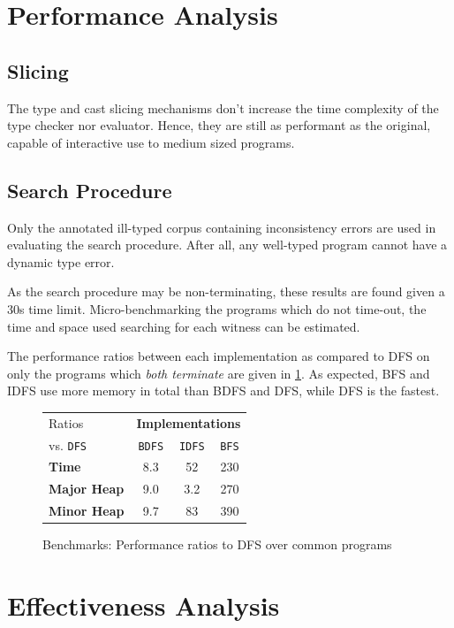 \section{Performance Analysis}\label{sec:PerformanceAnalysis}
\subsection{Slicing}
The type and cast slicing mechanisms don't increase the time complexity of the type checker nor evaluator. Hence, they are still as performant as the original, capable of interactive use to medium sized programs.

\subsection{Search Procedure}
Only the annotated ill-typed corpus containing inconsistency errors are used in evaluating the search procedure. After all, any well-typed program cannot have a dynamic type error.

As the search procedure may be non-terminating, these results are found given a 30s time limit. Micro-benchmarking the programs which do not time-out, the time and space used searching for each witness can be estimated. 

The performance ratios between each implementation as compared to DFS on only the programs which \textit{both terminate} are given in \cref{fig:SearchPerformanceRatios}. As expected, BFS and IDFS use more memory in total than BDFS and DFS, while DFS is the fastest. 
\begin{figure}
  \centering
  \begin{tabular}{l|ccc}
  Ratios & \multicolumn{3}{c}{\textbf{Implementations}}\\
    vs. \texttt{DFS}& \texttt{BDFS} & \texttt{IDFS} & \texttt{BFS} \\
   \hline
   \textbf{Time} &  8.3 & 52 & 230\\
   \textbf{Major Heap} & 9.0 & 3.2 & 270\\
   \textbf{Minor Heap} & 9.7 & 83 & 390
  \end{tabular}
  
\caption{Benchmarks: Performance ratios to DFS over common programs}
\label{fig:SearchPerformanceRatios}
\end{figure}


\section{Effectiveness Analysis}\label{sec:EffectivenessAnalysis}


